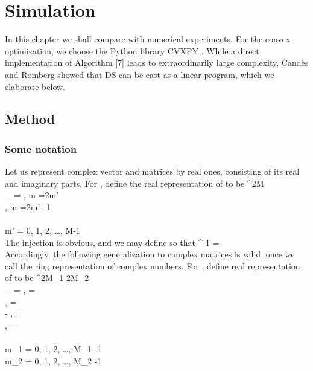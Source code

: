 \chapter {Simulation}

In this chapter we shall compare  with numerical experiments.
For the convex optimization, we choose the Python library CVXPY \cite {DiB16}.
While a direct implementation of Algorithm [7] leads to extraordinarily large complexity, Candès and Romberg \cite {CaR05} showed that DS can be cast as a linear program, which we elaborate below.

\section {Method}

\subsection {Some notation}

Let us represent complex vector and matrices by real ones, consisting of its real and imaginary parts.
For , define the real representation  of  to be
%
 {
 
\in {} ^{2M} \\
  _{}
= \startcases
{} , \MC m =2m' \\
 , \MC m =2m'+1 \\
\stopcases \\
m' 
=  0, 1, 2, \ldots, M-1 \\
}
%
The injection is obvious, and we may define  so that
%
 {
 ^{-1} 
= \\
}
%
Accordingly, the following generalization to complex matrices is valid, once we call the ring representation of complex numbers.
For , define real representation  of  to be
%
 {
 
\in {} ^{2M_1 \D 2M_2} \\
  _{} =
\startcases
{} , \MC {} =  \\
 , \MC {} =  \\
- , \MC {} =  \\
 , \MC {} =  \\
\stopcases \\
m_1 
= 0, 1, 2, \ldots, M_1 -1 \\
m_2 
= 0, 1, 2, \ldots, M_2 -1 \\
}

